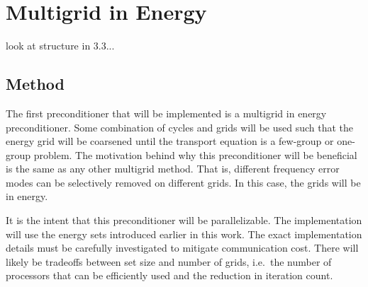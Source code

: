 \section{Multigrid in Energy}
look at structure in 3.3...



\subsection{Method}
The first preconditioner that will be implemented is a multigrid in energy preconditioner. Some combination of cycles and grids will be used such that the energy grid will be coarsened until the transport equation is a few-group or one-group problem. The motivation behind why this preconditioner will be beneficial is the same as any other multigrid method. That is, different frequency error modes can be selectively removed on different grids. In this case, the grids will be in energy.

It is the intent that this preconditioner will be parallelizable. The implementation will use the energy sets introduced earlier in this work. The exact implementation details must be carefully investigated to mitigate communication cost. There will likely be tradeoffs between set size and number of grids, i.e.\ the number of processors that can be efficiently used and the reduction in iteration count.  

